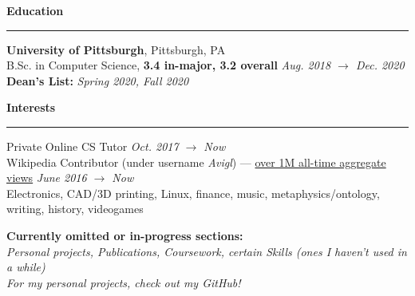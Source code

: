 \documentclass[10pt]{article}
\begin{document}
\begin{flushleft}
		\vspace{1.5mm}
		{\large \raggedright \textbf{Education}}
		\vspace{1.25mm}
	
		\hrule
		
		\vspace{2.25mm}
		\textbf{University of Pittsburgh}, Pittsburgh, PA\\
      	{\small B.Sc. in Computer Science, \textbf{3.4 in-major, 3.2 overall} \hfill \textit{Aug. 2018 $\rightarrow$ Dec. 2020}}\\
		{\small \textbf{Dean's List:} \textit{Spring 2020, Fall 2020}}\\

		\vspace{1.25mm}
		{\large \raggedright \textbf{Interests}}
		\vspace{1.25mm}
	
		\hrule
	
		\vspace{2.25mm}
		Private Online CS Tutor \hfill \textit{\small Oct. 2017 $\rightarrow$ Now}\\
		Wikipedia Contributor (under username \textit{Avigl}) --- \href{https://pageviews.toolforge.org/?project=en.wikipedia.org&platform=all-access&agent=user&redirects=0&range=all-time&pages=Timeline_of_social_media|Timeline_of_online_advertising|Timeline_of_e-commerce|Screening_Partnership_Program|Silicon_Valley_Education_Foundation|Chicago_Community_Trust}{over 1M all-time aggregate views} \hfill \textit{\small June 2016 $\rightarrow$ Now}\\
		Electronics, CAD/3D printing, Linux, finance, music, metaphysics/ontology, writing, history, videogames

		\vspace*{\fill}
		\textbf{Currently omitted or in-progress sections:}\\ 
		\textit{Personal projects, Publications, Coursework, certain Skills (ones I haven't used in a while)}\\
		{\footnotesize \textit{For my personal projects, check out my GitHub!}}
	\end{flushleft}
\end{document}
